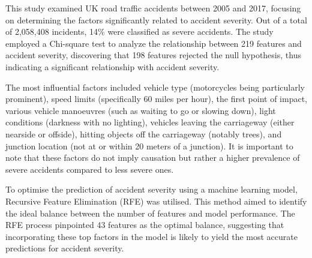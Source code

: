 This study examined UK road traffic accidents between 2005 and 2017, focusing on determining the factors significantly related to accident severity.
Out of a total of 2,058,408 incidents, 14\% were classified as severe accidents.
The study employed a Chi-square test to analyze the relationship between 219 features and accident severity, discovering that 198 features rejected the null hypothesis, thus indicating a significant relationship with accident severity.

The most influential factors included vehicle type (motorcycles being particularly prominent), speed limits (specifically 60 miles per hour), the first point of impact, various vehicle manoeuvres (such as waiting to go or slowing down), light conditions (darkness with no lighting), vehicles leaving the carriageway (either nearside or offside), hitting objects off the carriageway (notably trees), and junction location (not at or within 20 meters of a junction).
It is important to note that these factors do not imply causation but rather a higher prevalence of severe accidents compared to less severe ones.

To optimise the prediction of accident severity using a machine learning model, Recursive Feature Elimination (RFE) was utilised.
This method aimed to identify the ideal balance between the number of features and model performance.
The RFE process pinpointed 43 features as the optimal balance, suggesting that incorporating these top factors in the model is likely to yield the most accurate predictions for accident severity.